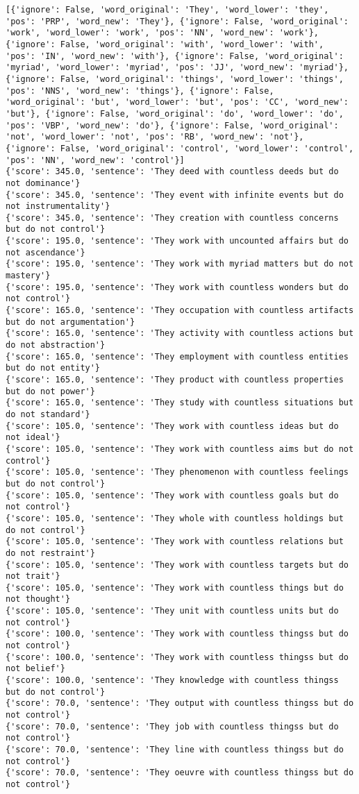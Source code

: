 \documentclass[12pt,a4paper,oneside]{book}
\begin{document}
\begin{verbatim}
[{'ignore': False, 'word_original': 'They', 'word_lower': 'they', 'pos': 'PRP', 'word_new': 'They'}, {'ignore': False, 'word_original': 'work', 'word_lower': 'work', 'pos': 'NN', 'word_new': 'work'}, {'ignore': False, 'word_original': 'with', 'word_lower': 'with', 'pos': 'IN', 'word_new': 'with'}, {'ignore': False, 'word_original': 'myriad', 'word_lower': 'myriad', 'pos': 'JJ', 'word_new': 'myriad'}, {'ignore': False, 'word_original': 'things', 'word_lower': 'things', 'pos': 'NNS', 'word_new': 'things'}, {'ignore': False, 'word_original': 'but', 'word_lower': 'but', 'pos': 'CC', 'word_new': 'but'}, {'ignore': False, 'word_original': 'do', 'word_lower': 'do', 'pos': 'VBP', 'word_new': 'do'}, {'ignore': False, 'word_original': 'not', 'word_lower': 'not', 'pos': 'RB', 'word_new': 'not'}, {'ignore': False, 'word_original': 'control', 'word_lower': 'control', 'pos': 'NN', 'word_new': 'control'}]
{'score': 345.0, 'sentence': 'They deed with countless deeds but do not dominance'}
{'score': 345.0, 'sentence': 'They event with infinite events but do not instrumentality'}
{'score': 345.0, 'sentence': 'They creation with countless concerns but do not control'}
{'score': 195.0, 'sentence': 'They work with uncounted affairs but do not ascendance'}
{'score': 195.0, 'sentence': 'They work with myriad matters but do not mastery'}
{'score': 195.0, 'sentence': 'They work with countless wonders but do not control'}
{'score': 165.0, 'sentence': 'They occupation with countless artifacts but do not argumentation'}
{'score': 165.0, 'sentence': 'They activity with countless actions but do not abstraction'}
{'score': 165.0, 'sentence': 'They employment with countless entities but do not entity'}
{'score': 165.0, 'sentence': 'They product with countless properties but do not power'}
{'score': 165.0, 'sentence': 'They study with countless situations but do not standard'}
{'score': 105.0, 'sentence': 'They work with countless ideas but do not ideal'}
{'score': 105.0, 'sentence': 'They work with countless aims but do not control'}
{'score': 105.0, 'sentence': 'They phenomenon with countless feelings but do not control'}
{'score': 105.0, 'sentence': 'They work with countless goals but do not control'}
{'score': 105.0, 'sentence': 'They whole with countless holdings but do not control'}
{'score': 105.0, 'sentence': 'They work with countless relations but do not restraint'}
{'score': 105.0, 'sentence': 'They work with countless targets but do not trait'}
{'score': 105.0, 'sentence': 'They work with countless things but do not thought'}
{'score': 105.0, 'sentence': 'They unit with countless units but do not control'}
{'score': 100.0, 'sentence': 'They work with countless thingss but do not control'}
{'score': 100.0, 'sentence': 'They work with countless thingss but do not belief'}
{'score': 100.0, 'sentence': 'They knowledge with countless thingss but do not control'}
{'score': 70.0, 'sentence': 'They output with countless thingss but do not control'}
{'score': 70.0, 'sentence': 'They job with countless thingss but do not control'}
{'score': 70.0, 'sentence': 'They line with countless thingss but do not control'}
{'score': 70.0, 'sentence': 'They oeuvre with countless thingss but do not control'}


\end{verbatim}
\end{document}
